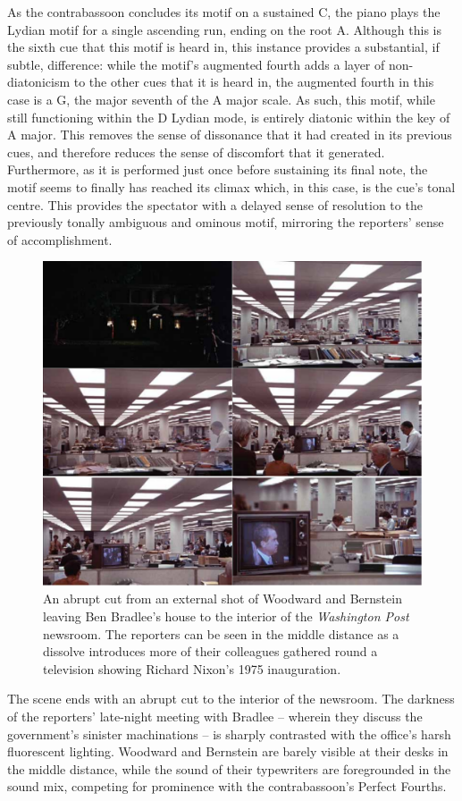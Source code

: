 As the contrabassoon concludes its motif on a sustained C\sharp, the piano plays the Lydian motif for a single ascending run, ending on the root A.
Although this is the sixth cue that this motif is heard in, this instance provides a substantial, if subtle, difference:
while the motif's augmented fourth adds a layer of non-diatonicism to the other cues that it is heard in, the augmented fourth in this case is a G\sharp, the major seventh of the A major scale.
As such, this motif, while still functioning within the D Lydian mode, is entirely diatonic within the key of A major.
This removes the sense of dissonance that it had created in its previous cues, and therefore reduces the sense of discomfort that it generated.
Furthermore, as it is performed just once before sustaining its final note, the motif seems to finally has reached its climax which, in this case, is the cue's tonal centre.
This provides the spectator with a delayed sense of resolution to the previously tonally ambiguous and ominous motif, mirroring the reporters' sense of accomplishment.
\begin{figure}
    \centering
    \includegraphics[width=0.5\linewidth]{img/president-ending-dissolve.pdf}
    \caption{An abrupt cut from an external shot of Woodward and Bernstein leaving Ben Bradlee's house to the interior of the \textit{Washington Post} newsroom. The reporters can be seen in the middle distance as a dissolve introduces more of their colleagues gathered round a television showing Richard Nixon's 1975 inauguration.}
    \label{fig:president-ending-dissolve}
\end{figure}

The scene ends with an abrupt cut to the interior of the newsroom.
The darkness of the reporters' late-night meeting with Bradlee – wherein they discuss the government's sinister machinations – is sharply contrasted with the office's harsh fluorescent lighting.\autocites[The use of fluorescent lights was another decision made to replicate the exact look and feel of \textit{The Washington Post}'s newsroom. As cinematographer Gordon Willis writes: ``Prior to construction, the lighting was discussed at length and, since the real newsroom is lit exclusively with fluorescent lamps, my feeling was to keep it just that way. Fluorescent has a look all its own and I wanted to retain that look. So, fluorescent it was."][]{willis_photographing_2019}
Woodward and Bernstein are barely visible at their desks in the middle distance, while the sound of their typewriters are foregrounded in the sound mix, competing for prominence with the contrabassoon's Perfect Fourths.

